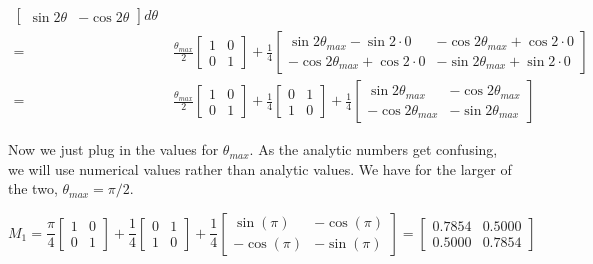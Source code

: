 \documentclass[11pt,english]{article}
\begin{document}
\begin{enumerate}
\begin{align*}
\begin{bmatrix}
            \sin 2\theta & -\cos 2\theta
        \end{bmatrix} d\theta \\ 
    =&\; \frac{\theta_{max}}{2} 
        \begin{bmatrix}
            1 & 0 \\
            0 & 1
        \end{bmatrix} + \frac{1}{4} 
        \begin{bmatrix}
            \sin 2\theta_{max} - \sin 2 \cdot 0 & -\cos 2\theta_{max} + \cos 2\cdot 0 \\
            -\cos 2\theta_{max} + \cos 2\cdot 0 & -\sin 2\theta_{max} + \sin 2 \cdot 0
        \end{bmatrix} \\ 
    =&\; \frac{\theta_{max}}{2} 
        \begin{bmatrix}
            1 & 0 \\
            0 & 1
        \end{bmatrix} + \frac{1}{4} 
        \begin{bmatrix}
            0 & 1 \\
            1 & 0
        \end{bmatrix} + \frac{1}{4} 
        \begin{bmatrix}
            \sin 2\theta_{max}  & -\cos 2\theta_{max}  \\
            -\cos 2\theta_{max} & -\sin 2\theta_{max} 
        \end{bmatrix}  
\end{align*}

Now we just plug in the values for $\theta_{max}$. As the analytic numbers get confusing, we
will use numerical values rather than analytic values. We have for the larger of the two, 
$\theta_{max} = \pi/2$.

\[
M_1 = \frac{\pi}{4} 
\begin{bmatrix}
    1 & 0 \\
    0 & 1
\end{bmatrix} + \frac{1}{4} 
\begin{bmatrix}
    0 & 1 \\
    1 & 0
\end{bmatrix} + \frac{1}{4} 
\begin{bmatrix}
    \sin (\pi)  & -\cos (\pi) \\
    -\cos (\pi) & -\sin (\pi) 
\end{bmatrix}
= \begin{bmatrix}
    0.7854 & 0.5000 \\
    0.5000 & 0.7854
\end{bmatrix} \]


\end{enumerate}
\end{document}
